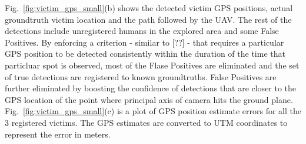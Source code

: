 \documentclass[runningheads]{llncs}
\begin{document}
Fig.~\ref{fig:victim_gps_small}(b) shows the detected victim GPS positions, actual groundtruth victim location and the path followed by the UAV. The rest of the detections include unregistered humans in the explored area and some False Positives. By enforcing a criterion - similar to [??] - that requires a particular GPS position to be detected consistently within the duration of the time that particluar spot is observed, most of the Flase Positives are eliminated and the set of true detections are registered to known groundtruths. False Positives are further eliminated by boosting the confidence of detections that are closer to the GPS location of the point where principal axis of camera hits the ground plane. Fig.~\ref{fig:victim_gps_small}(c) is a plot of GPS position estimate errors for all the 3 registered victims. The GPS estimates are converted to UTM coordinates to represent the error in meters.
\end{document}
